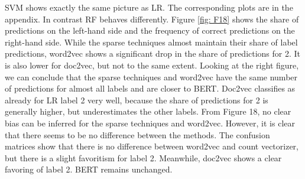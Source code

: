 \documentclass[12pt, a4paper, titlepage]{article}
\begin{document}
\ac{SVM} shows exactly the same picture as \ac{LR}. The corresponding plots are in the appendix. In contrast \ac{RF} behaves differently. Figure \ref{fig: F18} shows the share of predictions on the left-hand side and the frequency of correct predictions on the right-hand side. While the sparse techniques almost maintain their share of label predictions, word2vec shows a significant drop in the share of predictions for 2. It is also lower for doc2vec, but not to the same extent. Looking at the right figure, we can conclude that the sparse techniques and word2vec have the same number of predictions for almost all labels and are closer to BERT. Doc2vec classifies as already for LR label 2 very well, because the share of predictions for 2 is generally higher, but underestimates the other labels. From Figure 18, no clear bias can be inferred for the sparse techniques and word2vec. However, it is clear that there seems to be no difference between the methods. The confusion matrices show that there is no difference between word2vec and count vectorizer, but there is a slight favoritism for label 2. Meanwhile, doc2vec shows a clear favoring of label 2. BERT remains unchanged.
\end{document}
